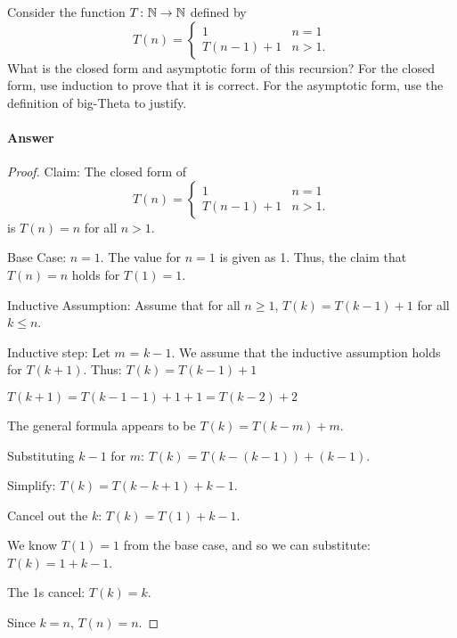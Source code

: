 \documentclass{article}
\begin{document}
Consider the function $T \colon {\mathbb N} \to {\mathbb N}$ defined by
$$T(n) = \begin{cases}
            1        & n=1\\
            T(n-1)+1 & n>1.
         \end{cases}
$$
What is the closed form and asymptotic form of this recursion?  For the
closed form, use induction to prove that it is correct.  For the asymptotic
form, use the definition of big-Theta to justify.

\paragraph{Answer}
\begin{proof}
Claim: The closed form of $$T(n) = \begin{cases}
            1        & n=1\\
            T(n-1)+1 & n>1.
         \end{cases}
$$ is $T(n) = n$ for all $n > 1$. 

Base Case: $n = 1$. The value for $n = 1$ is given as 1. Thus, the claim that $T(n) = n$ holds for $T(1) = 1$. 

Inductive Assumption: Assume that for all $n \geq 1$, $T(k) = T(k-1) + 1$ for all $k \leq n$.

Inductive step: Let $m$ = $k - 1$. We assume that the inductive assumption holds for $T(k + 1)$. Thus: 
$T(k) = T(k-1) + 1$

$T(k + 1) = T(k - 1 - 1) + 1  + 1 = T(k - 2) + 2$

The general formula appears to be $T(k) = T(k - m) + m.$

Substituting $k-1$ for $m$: $T(k) = T(k - (k - 1)) + (k - 1).$

Simplify: $T(k) = T(k - k + 1) + k - 1.$

Cancel out the $k$: $T(k) = T(1) + k - 1.$

We know $T(1) = 1$ from the base case, and so we can substitute: $T(k) = 1 + k - 1$.

The 1s cancel: $T(k) = k$. 

Since $k = n$, $T(n) = n$.
\end{proof}
\end{document}
